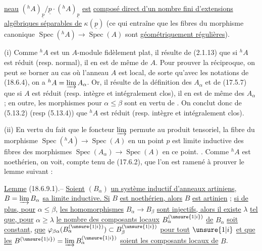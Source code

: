 
\uline{neau} $({}^h A)_{\underline p}/\underline p\cdot({}^h A)_{\underline p}$ \uline{est}  \uline{composé direct d'un nombre fini d'extensions algébriques séparables de} $\kappa(\underline p)$ (ce qui entraîne que les fibres du morphisme canonique $\operatorname{Spec}({}^h A)\to\operatorname{Spec}(A)$ sont \uline{géométriquement régulières}).

(i) Comme ${}^h A$ est un $A$-module fidèlement plat, il résulte de (2.1.13) que si ${}^h A$ est  réduit (resp. normal), il en est de même de $A$. Pour prouver la réciproque, on peut se borner au cas où l'anneau $A$ est local, de sorte  qu'avec les notations de (18.6.4), on a ${}^h A=\varinjlim A_\alpha$. Or, il résulte de la définition des $A_\alpha$ et de (17.5.7) que si $A$ est réduit (resp. intègre et intégralement clos), il en est de même des $A_\alpha$ ;  en outre, les   morphismes   pour $\alpha\leq\beta$ sont   en vertu de . On conclut donc de (5.13.2) (resp (5.13.4)) que ${}^h A$ est réduit (resp. intègre et intégralement clos).

(ii)  En vertu du fait que le foncteur $\varinjlim$ permute au produit tensoriel, la fibre du morphisme $\operatorname{Spec}({}^h A)\to\operatorname{Spec}(A)$ en un point $p$ est limite inductive des fibres des morphismes $\operatorname{Spec}(A_\alpha)\to\operatorname{Spec}(A)$ en ce point. . Comme ${}^h A$ est noethérien, on voit, compte tenu de (17.6.2), que l'on est ramené à prouver le lemme suivant :

\uline{Lemme} (18.6.9.1).-- \uline{Soient}  $(B_\alpha)$ \uline{un système inductif d'anneaux artiniens}, $B=\varinjlim B_\alpha$ \uline{sa limite inductive. Si} $B$ \uline{est noethérien, alors} $B$ \uline{est artinien} ;  \uline{si de plus, pour} $\alpha\leq\beta$, \uline{les homomorphismes} \inserted{$\varphi_{\beta\alpha}:$} $B_\alpha\to B_\beta$ \uline{sont injectifs, alors il existe} $\lambda$ \uline{tel que, pour} $\alpha\geq\lambda$ \uline{le nombre des composants locaux}  $B_\alpha^{(\unsure{1|i})}$ \uline{de} $B_\alpha$ \uline{soit constant},  \uline{que} $\varphi_{\beta\alpha}(B_\alpha^{(\unsure{1|i})})\subset B_\beta^{(\unsure{1|i})}$ \uline{pour tout} $\unsure{1|i}$ \uline{et que les} $B^{(\unsure{1|i})}=\varinjlim B_\alpha^{(\unsure{1|i})}$ \uline{soient les composants locaux de} $B$.

